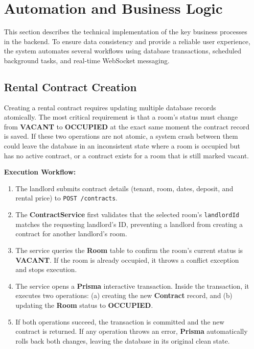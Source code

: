 \section{Automation and Business Logic}

This section describes the technical implementation of the key business processes in the backend. To ensure data consistency and provide a reliable user experience, the system automates several workflows using database transactions, scheduled background tasks, and real-time WebSocket messaging.

\subsection{Rental Contract Creation}

Creating a rental contract requires updating multiple database records atomically. The most critical requirement is that a room's status must change from \textbf{VACANT} to \textbf{OCCUPIED} at the exact same moment the contract record is saved. If these two operations are not atomic, a system crash between them could leave the database in an inconsistent state where a room is occupied but has no active contract, or a contract exists for a room that is still marked vacant.

\textbf{Execution Workflow:}
\begin{enumerate}
    \item The landlord submits contract details (tenant, room, dates, deposit, and rental price) to \texttt{POST /contracts}.
    \item The \textbf{ContractService} first validates that the selected room's \texttt{landlordId} matches the requesting landlord's ID, preventing a landlord from creating a contract for another landlord's room.
    \item The service queries the \textbf{Room} table to confirm the room's current status is \textbf{VACANT}. If the room is already occupied, it throws a conflict exception and stops execution.
    \item The service opens a \textbf{Prisma} interactive transaction. Inside the transaction, it executes two operations: (a) creating the new \textbf{Contract} record, and (b) updating the \textbf{Room} status to \textbf{OCCUPIED}.
    \item If both operations succeed, the transaction is committed and the new contract is returned. If any operation throws an error, \textbf{Prisma} automatically rolls back both changes, leaving the database in its original clean state.
\end{enumerate}

